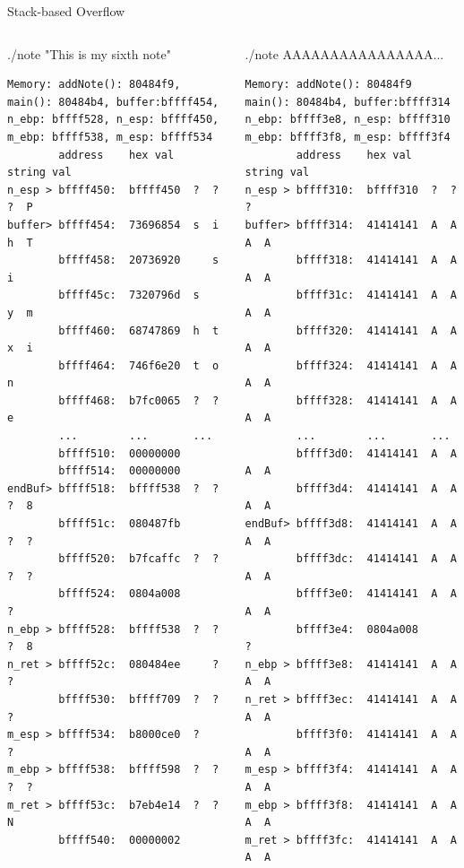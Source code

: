 \begin{frame}{Stack-based Overflow}
\begin{columns}[T]
	\begin{column}{.5\textwidth}
	\tiny\begin{block}{./note "This is my sixth note"}
	\tiny\begin{verbatim}
Memory: addNote(): 80484f9,
main(): 80484b4, buffer:bffff454,
n_ebp: bffff528, n_esp: bffff450,
m_ebp: bffff538, m_esp: bffff534
        address    hex val   string val
n_esp > bffff450:  bffff450  ?  ?  ?  P
buffer> bffff454:  73696854  s  i  h  T
        bffff458:  20736920     s  i   
        bffff45c:  7320796d  s     y  m
        bffff460:  68747869  h  t  x  i
        bffff464:  746f6e20  t  o  n   
        bffff468:  b7fc0065  ?  ?     e
        ...        ...       ...
        bffff510:  00000000           
        bffff514:  00000000           
endBuf> bffff518:  bffff538  ?  ?  ?  8
        bffff51c:  080487fb        ?  ?
        bffff520:  b7fcaffc  ?  ?  ?  ?
        bffff524:  0804a008        ?  
n_ebp > bffff528:  bffff538  ?  ?  ?  8
n_ret > bffff52c:  080484ee     ?  ?
        bffff530:  bffff709  ?  ?  ?  	
m_esp > bffff534:  b8000ce0  ?        ?
m_ebp > bffff538:  bffff598  ?  ?  ?  ?
m_ret > bffff53c:  b7eb4e14  ?  ?  N  
        bffff540:  00000002	       
	\end{verbatim}
	\end{block}
	\end{column}
	\begin{column}{.5\textwidth}
	\tiny\begin{block}{./note AAAAAAAAAAAAAAAA...}
	\tiny\begin{verbatim}
Memory: addNote(): 80484f9
main(): 80484b4, buffer:bffff314
n_ebp: bffff3e8, n_esp: bffff310
m_ebp: bffff3f8, m_esp: bffff3f4
        address    hex val	string val
n_esp > bffff310:  bffff310  ?  ?  ?  
buffer> bffff314:  41414141  A  A  A  A
        bffff318:  41414141  A  A  A  A
        bffff31c:  41414141  A  A  A  A
        bffff320:  41414141  A  A  A  A
        bffff324:  41414141  A  A  A  A
        bffff328:  41414141  A  A  A  A
        ...        ...       ...
        bffff3d0:  41414141  A  A  A  A
        bffff3d4:  41414141  A  A  A  A
endBuf> bffff3d8:  41414141  A  A  A  A
        bffff3dc:  41414141  A  A  A  A
        bffff3e0:  41414141  A  A  A  A
        bffff3e4:  0804a008        ?  
n_ebp > bffff3e8:  41414141  A  A  A  A
n_ret > bffff3ec:  41414141  A  A  A  A
        bffff3f0:  41414141  A  A  A  A
m_esp > bffff3f4:  41414141  A  A  A  A
m_ebp > bffff3f8:  41414141  A  A  A  A
m_ret > bffff3fc:  41414141  A  A  A  A

\end{verbatim}
\end{block}
\end{column}
\end{columns}
\end{frame}
